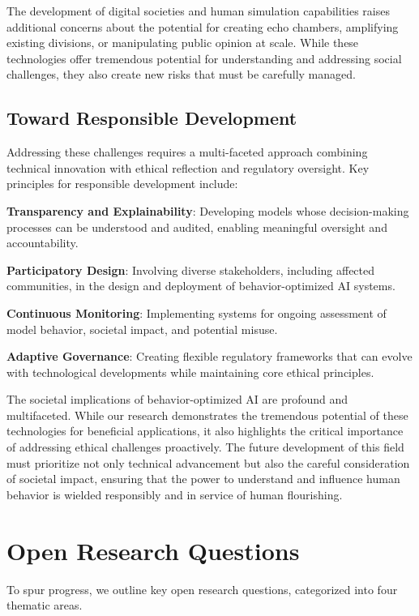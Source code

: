 The development of digital societies and human simulation capabilities raises additional concerns about the potential for creating echo chambers, amplifying existing divisions, or manipulating public opinion at scale. While these technologies offer tremendous potential for understanding and addressing social challenges, they also create new risks that must be carefully managed.

\subsection{Toward Responsible Development}

Addressing these challenges requires a multi-faceted approach combining technical innovation with ethical reflection and regulatory oversight. Key principles for responsible development include:

\textbf{Transparency and Explainability}: Developing models whose decision-making processes can be understood and audited, enabling meaningful oversight and accountability.

\textbf{Participatory Design}: Involving diverse stakeholders, including affected communities, in the design and deployment of behavior-optimized AI systems.

\textbf{Continuous Monitoring}: Implementing systems for ongoing assessment of model behavior, societal impact, and potential misuse.

\textbf{Adaptive Governance}: Creating flexible regulatory frameworks that can evolve with technological developments while maintaining core ethical principles.

The societal implications of behavior-optimized AI are profound and multifaceted. While our research demonstrates the tremendous potential of these technologies for beneficial applications, it also highlights the critical importance of addressing ethical challenges proactively. The future development of this field must prioritize not only technical advancement but also the careful consideration of societal impact, ensuring that the power to understand and influence human behavior is wielded responsibly and in service of human flourishing.


\section{Open Research Questions}

To spur progress, we outline key open research questions, categorized into four thematic areas.

